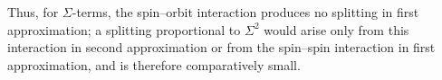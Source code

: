 Thus, for $\Sigma$-terms, the spin--orbit interaction produces no splitting in first approximation; a splitting proportional to $\Sigma^2$ would arise only from this interaction in second approximation or from the spin--spin interaction in first approximation, and is therefore comparatively small.
